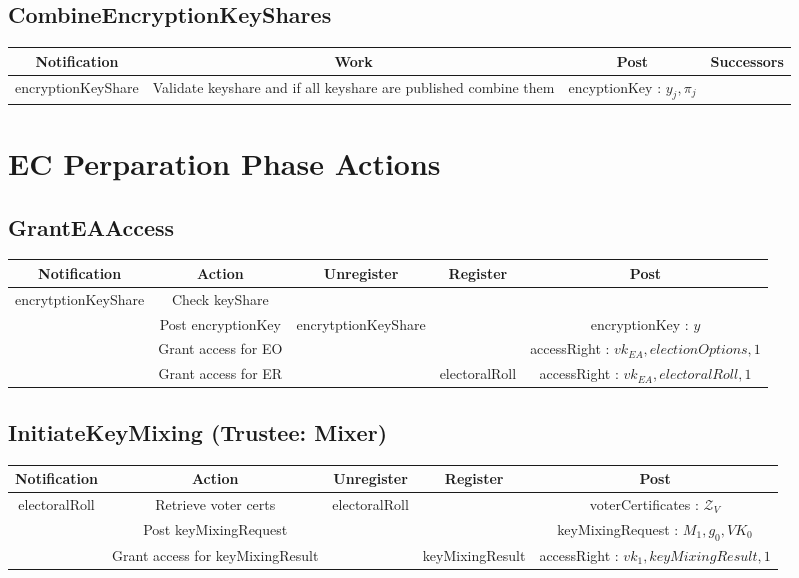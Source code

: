 \documentclass[bibtotoc,halfparskip,oneside]{scrreprt}
\begin{document}
\begin{landscape}
		\subsection{CombineEncryptionKeyShares}
		\begin{tabularx}{\linewidth}{|c|c|c|X|}
			\hline Notification & Work & Post & Successors\\  
			\hline  encryptionKeyShare & Validate keyshare and if all keyshare are published combine them & encyptionKey : $y_j, \pi_j $ &   \\ 
			\hline 
			\end{tabularx}
			
			
		
		\section{EC Perparation Phase Actions}
		
		
		\subsection{GrantEAAccess}
		\begin{tabular}{|c|c|c|c|c|}
			\hline Notification & Action & Unregister & Register & Post \\ 
			\hline encrytptionKeyShare & Check keyShare & & & \\ 
			\hline & Post encryptionKey & encrytptionKeyShare & & encryptionKey : $y$  \\ 
			& Grant access for EO & & & accessRight : $vk_{EA}, electionOptions , 1 $ \\
			& Grant access for ER & & electoralRoll & accessRight : $vk_{EA}, electoralRoll , 1 $ \\ 
			\hline 
		\end{tabular}
		
		\subsection{InitiateKeyMixing (Trustee: Mixer)}
		\begin{tabular}{|c|c|c|c|c|}
			\hline Notification & Action & Unregister & Register & Post \\ 
			\hline electoralRoll & Retrieve voter certs & electoralRoll &  & voterCertificates : $\mathcal{Z}_V$ \\ 
			& Post keyMixingRequest & & & keyMixingRequest : $M_1,g_0, VK_0 $  \\
			& Grant access for keyMixingResult & & keyMixingResult & accessRight : $vk_1, keyMixingResult , 1 $  \\
			\hline 
		\end{tabular}
		

\end{landscape}
\end{document}
